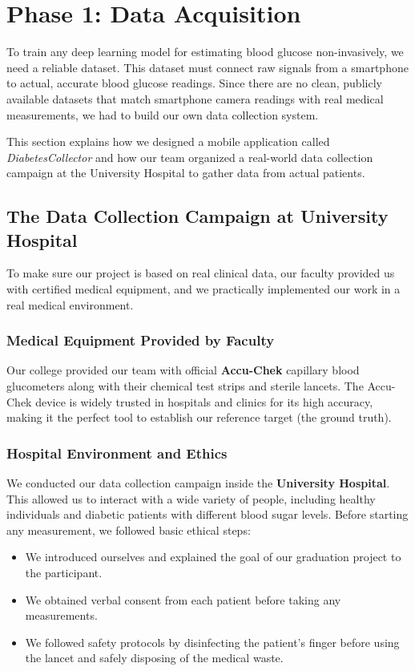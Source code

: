 \section{Phase 1: Data Acquisition}
\label{sec:phase1_collection}
To train any deep learning model for estimating blood glucose non-invasively, we need a reliable dataset. This dataset must connect raw signals from a smartphone to actual, accurate blood glucose readings. Since there are no clean, publicly available datasets that match smartphone camera readings with real medical measurements, we had to build our own data collection system.

This section explains how we designed a mobile application called \textit{DiabetesCollector} and how our team organized a real-world data collection campaign at the University Hospital to gather data from actual patients.

\subsection{The Data Collection Campaign at University Hospital}
To make sure our project is based on real clinical data, our faculty provided us with certified medical equipment, and we practically implemented our work in a real medical environment.

\subsubsection{Medical Equipment Provided by Faculty}
Our college provided our team with official \textbf{Accu-Chek} capillary blood glucometers along with their chemical test strips and sterile lancets. The Accu-Chek device is widely trusted in hospitals and clinics for its high accuracy, making it the perfect tool to establish our reference target (the ground truth). 

\subsubsection{Hospital Environment and Ethics}
We conducted our data collection campaign inside the \textbf{University Hospital}. This allowed us to interact with a wide variety of people, including healthy individuals and diabetic patients with different blood sugar levels. Before starting any measurement, we followed basic ethical steps:
\begin{itemize}
    \item We introduced ourselves and explained the goal of our graduation project to the participant.
    \item We obtained verbal consent from each patient before taking any measurements.
    \item We followed safety protocols by disinfecting the patient's finger before using the lancet and safely disposing of the medical waste.
\end{itemize}

